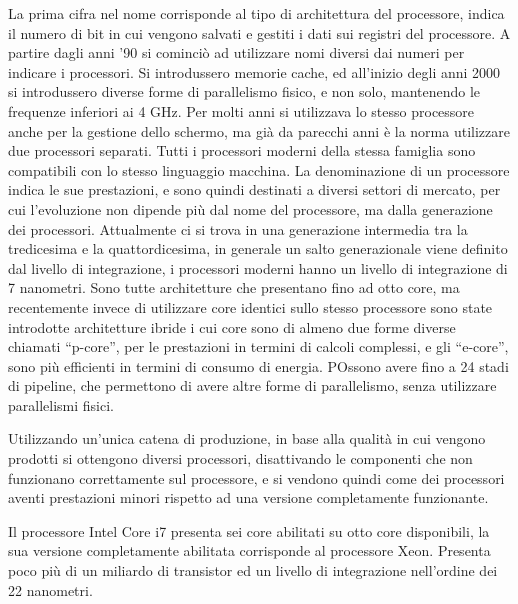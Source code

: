 \documentclass{article}
\numberwithin{equation}{subsection}
\begin{document}
La prima cifra nel nome corrisponde al tipo di architettura del processore, indica il numero di bit in cui vengono salvati e gestiti i dati sui registri del processore. 
A partire dagli anni '90 si cominciò ad utilizzare nomi diversi dai numeri per indicare i processori. Si introdussero memorie cache, ed all'inizio degli anni 2000 si introdussero 
diverse forme di parallelismo fisico, e non solo, mantenendo le frequenze inferiori ai 4 GHz. Per molti anni si utilizzava lo stesso processore anche per la gestione 
dello schermo, ma già da parecchi anni è la norma utilizzare due processori separati. 
Tutti i processori moderni della stessa famiglia sono compatibili con lo stesso linguaggio macchina. La denominazione di un processore indica le sue prestazioni, e sono 
quindi destinati a diversi settori di mercato, per cui l'evoluzione non dipende più dal nome del processore, ma dalla generazione dei processori. Attualmente ci si trova 
in una generazione intermedia tra la tredicesima e la quattordicesima, in generale un salto generazionale viene definito dal livello di integrazione, i processori moderni 
hanno un livello di integrazione di 7 nanometri. 
Sono tutte architetture che presentano fino ad otto core, ma recentemente invece di utilizzare core identici sullo stesso processore sono state introdotte architetture ibride 
i cui core sono di almeno due forme diverse chiamati ``p-core'', per le prestazioni in termini di calcoli complessi, e gli ``e-core'', sono più efficienti in termini di consumo 
di energia. POssono avere fino a 24 stadi di pipeline, che permettono di avere altre forme di parallelismo, senza utilizzare parallelismi fisici. 

Utilizzando un'unica catena di produzione, in base alla qualità in cui vengono prodotti si ottengono diversi processori, disattivando le componenti che non funzionano 
correttamente sul processore, e si vendono quindi come dei processori aventi prestazioni minori rispetto ad una versione completamente funzionante. 

Il processore Intel Core i7 presenta sei core abilitati su otto core disponibili, la sua versione completamente abilitata corrisponde al processore Xeon. Presenta poco più di 
un miliardo di transistor ed un livello di integrazione nell'ordine dei 22 nanometri. 


\end{document}
